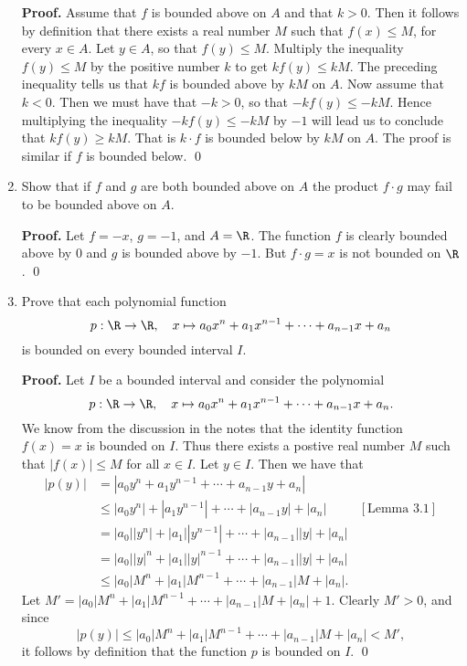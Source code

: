 \begin{enumerate}
      \textbf{Proof.} Assume that $f$ is bounded above on $A$ and that $k > 0$.
      Then it follows by definition that there exists a real number $M$ such
      that $f(x) \le M$, for every $x \in A$. Let $y \in A$, so that
      $f(y) \le M$. Multiply the inequality $f(y) \le M$ by the positive number
      $k$ to get $kf(y) \le kM$. The preceding inequality tells us that $kf$ is
      bounded above by $kM$ on $A$. Now assume that $k < 0$. Then we must have
      that $-k > 0$, so that $-kf(y) \le -kM$. Hence multiplying the inequality
      $-kf(y) \le -kM$ by $-1$ will lead us to conclude that $kf(y) \ge kM$.
      That is $k \cdot f$ is bounded below by $kM$ on $A$. The proof is similar 
      if $f$ is bounded below. \qed
   \item Show that if $f$ and $g$ are both bounded above on $A$ the product
         $f \cdot g$ may fail to be bounded above on $A$.

      \textbf{Proof.} Let $f = -x$, $g = -1$, and $A = \R$. The function $f$ is
      clearly bounded above by 0 and $g$ is bounded above by $-1$. But
      $f \cdot g = x$ is not bounded on $\R$. \qed
   \item Prove that each polynomial function
         $$p : \R \rightarrow \R, \quad
           x \mapsto a_0x^n + a_1x^{n-1} + \cdots + a_{n-1}x + a_n$$
         is bounded on every bounded interval $I$.

      \textbf{Proof.} Let $I$ be a bounded interval and consider the polynomial
      $$p : \R \rightarrow \R, \quad
        x \mapsto a_0x^n + a_1x^{n-1} + \cdots + a_{n-1}x + a_n.$$
      We know from the discussion in the notes that the identity function
      $f(x) = x$ is bounded on $I$. Thus there exists a postive real number $M$ 
      such that $|f(x)| \le M$ for all $x \in I$. Let $y \in I$. Then we have
      that
      \begin{align*}
         |p(y)| &= |a_0y^n + a_1y^{n-1} + \cdots + a_{n-1}y + a_n| \\
                &\le |a_0y^n| + |a_1y^{n-1}| + \cdots + |a_{n-1}y| + |a_n| 
                &[\text{Lemma 3.1}] \\                
                &= |a_0||y^n| + |a_1||y^{n-1}| + \cdots + |a_{n-1}||y| + |a_n|\\
                &= |a_0||y|^n + |a_1||y|^{n-1} + \cdots + |a_{n-1}||y| + |a_n|\\
                &\le |a_0|M^n + |a_1|M^{n-1} + \cdots + |a_{n-1}|M + |a_n|.
      \end{align*}
      Let $M' = |a_0|M^n + |a_1|M^{n-1} + \cdots + |a_{n-1}|M + |a_n| + 1$.
      Clearly $M' > 0$, and since
      $$|p(y)| \le |a_0|M^n + |a_1|M^{n-1} + \cdots + |a_{n-1}|M + |a_n| < M',$$
      it follows by definition that the function $p$ is bounded on $I$. \qed
      

\end{enumerate}
